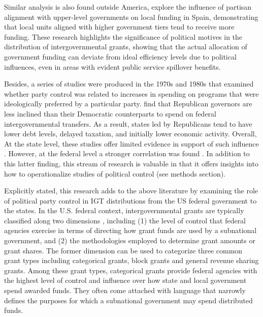 Similar analysis is also found outside America, \textcite{sole2008effects}explore the influence of partisan alignment with upper-level governments on local funding in Spain, demonstrating that local units aligned with higher government tiers tend to receive more funding.   These research highlights the significance of political motives in the distribution of intergovernmental grants, showing that the actual allocation of government funding can deviate from ideal efficiency levels due to political influences, even in areas with evident public service spillover benefits.

Besides, a series of studies were produced in the 1970s and 1980s that examined whether party control was related to increases in spending on programs that were ideologically preferred by a particular party. \textcite{carlino2023partisanship} find that Republican governors are less inclined than their Democratic counterparts to spend on federal intergovernmental transfers. As a result, states led by Republicans tend to have lower debt levels, delayed taxation, and initially lower economic activity. Overall,  At the state level,
these studies offer limited evidence in support of such influence \parencite{fry1970politics,winters1976party,plotnick1985politico,  lowery1987distribution, marquette1981competition, plotnick1990party}. However, at the federal level a stronger correlation was found \parencite{owens1984federal,browning1973geography,levitt1995political, ritt1976committee,kiewiet2002here, ansolabehere2006party}. In addition to this latter finding, this stream of research is valuable in that it offers insights into how
to operationalize studies of political control (see methods section).

Explicitly stated, this research adds to the above literature by examining the role of political party control in IGT distributions from the US federal government to the states. In the U.S. federal context, intergovernmental grants are typically classified along two dimensions \parencite{clemens2023intergovernmental,dilger2015federal}, including (1) the level of control that federal agencies exercise in terms of directing how grant funds are used by a subnational government, and (2) the methodologies employed to determine grant amounts or grant shares. The former dimension can be used to categorize three common grant types including categorical grants, block grants and general revenue sharing grants. Among these grant types, categorical grants provide federal agencies with the highest level of control and influence over how state and local government spend awarded funds. They often come attached with language that narrowly defines the purposes for which a subnational government may spend distributed funds.

